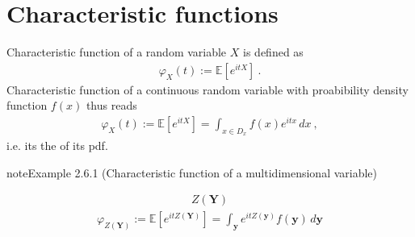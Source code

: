 \documentclass[letterpaper,10pt,english]{jupyterBook}
\begin{document}
\section{Characteristic functions}
\label{\detokenize{ch/prob/characteristic-fun:characteristic-functions}}\label{\detokenize{ch/prob/characteristic-fun:prob-characteristic-fun}}\label{\detokenize{ch/prob/characteristic-fun::doc}}
\sphinxAtStartPar
Characteristic function of a random variable \(X\) is defined as
\begin{equation*}
\begin{split}\varphi_X(t) := \mathbb{E} \left[ e^{i t X} \right] \ .\end{split}
\end{equation*}
\sphinxAtStartPar
Characteristic function of a continuous random variable with proabibility density function \(f(x)\) thus reads
\begin{equation*}
\begin{split}\varphi_X(t) := \mathbb{E} \left[ e^{i t X} \right] = \int_{x \in D_x} f(x) e^{i t x} \, dx \ ,\end{split}
\end{equation*}
\sphinxAtStartPar
i.e. its the  of its pdf.
\label{ch/prob/characteristic-fun:ex:char-fun:multidimensional}
\begin{sphinxadmonition}{note}{Example 2.6.1 (Characteristic function of a multi\sphinxhyphen{}dimensional variable)}


\begin{equation*}
\begin{split}Z(\mathbf{Y})\end{split}
\end{equation*}\begin{equation*}
\begin{split}\varphi_{Z(\mathbf{Y})} := \mathbb{E}\left[ e^{i t Z(\mathbf{Y})} \right] = \int_{\mathbf{y}} e^{i t Z(\mathbf{y})} f(\mathbf{y}) \, d \mathbf{y}\end{split}
\end{equation*}\end{sphinxadmonition}
\label{ch/prob/characteristic-fun:ex:char-fun:independent}
\end{document}
